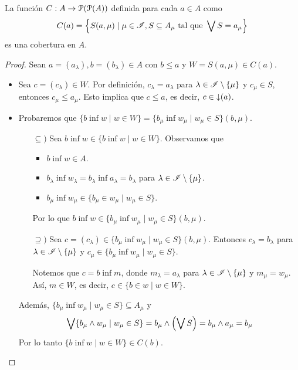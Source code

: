 \begin{lemma}
  \label{lemma:cobertura-en-A}
    La función $C:A\to\cal P(\cal P(A))$
    definida para cada $a\in A$ como
    \[
        C(a)
        =\left\{ S(a,\mu)
        \mid \mu\in\scr I, S\subseteq A_\mu
        \text{ tal que }\Sup S=a_\mu\right \}
    \]
    es una cobertura en $A$.
\end{lemma}
\begin{proof}
    Sean $a=(a_\lambda),b=(b_\lambda)\in A$ con $b\leq a$ y $W=S(a,\mu)\in C(a)$.
    \begin{itemize}
    \item Sea $c=(c_\lambda)\in W$. Por definición, $c_\lambda=a_\lambda$ para $\lambda\in \scr I\setminus\{\mu\}$ y $c_\mu \in S$, entonces $c_\mu\leq a_\mu$. Esto implica que $c\leq a$, es decir, $c\in \down(a)$.
    \end{itemize}
    
    \begin{itemize}
    \item Probaremos que $\{b\inf w\mid w\in W\}=\{b_\mu \inf w_\mu\mid w_\mu\in S\}(b,\mu)$.\par 
    \begin{itemize}
    \item[$\subseteq)$] Sea $b\inf w\in\{b\inf w\mid w\in W\}$. Observamos que 
    \begin{itemize}
    \item $b\inf w\in A$.
    \item $b_\lambda\inf w_\lambda=b_\lambda\inf a_\lambda=b_\lambda$ para $\lambda\in\scr I\setminus \{\mu\}$.
    \item $b_\mu\inf w_\mu\in\{b_\mu\in w_\mu\mid w_\mu\in S\}$.
    \end{itemize}
    Por lo que $b\inf w\in \{b_\mu \inf w_\mu\mid w_\mu\in S\}(b,\mu)$.
    \item[$\supseteq)$] Sea $c=(c_\lambda) \in \{b_\mu \inf w_\mu\mid w_\mu\in S\}(b,\mu)$. Entonces $c_\lambda=b_\lambda$ para $\lambda\in\scr I\setminus\{\mu\}$ y $c_\mu\in \{b_\mu \inf w_\mu\mid w_\mu\in S\}$.\par 
    Notemos que $c=b\inf m$, donde $m_\lambda=a_\lambda$ para $\lambda\in\scr I\setminus \{\mu\}$ y $m_\mu=w_\mu$. Así, $m\in W$, es decir, $c\in\{b\in w\mid w\in W\}$.
    \end{itemize}
    Además, $\{b_\mu \inf w_\mu\mid w_\mu\in S\}\subseteq A_\mu$ y
    \[\Sup\{b_\mu \inf w_\mu\mid w_\mu\in S\}=b_\mu\inf \left(\Sup S\right)=b_\mu\inf a_\mu=b_\mu\]
    Por lo tanto $\{b\inf w\mid w\in W\}\in C(b)$.
    \end{itemize}
\end{proof}

